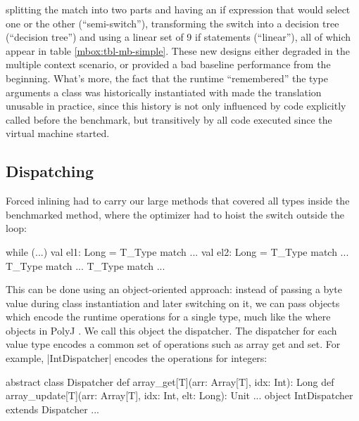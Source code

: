  splitting the match into two parts and having an if expression that would select one or the other (``semi-switch''), transforming the switch into a decision tree (``decision tree'') and using a linear set of 9 if statements (``linear''), all of which appear in table \ref{mbox:tbl-mb-simple}. These new designs either degraded in the multiple context scenario, or provided a bad baseline performance from the beginning. What's more, the fact that the runtime ``remembered'' the type arguments a class was historically instantiated with made the translation unusable in practice, since this history is not only influenced by code explicitly called before the benchmark, but transitively by all code executed since the virtual machine started. %

\subsection{Dispatching}
\label{mbox:subsec-mb-dispatching}

 Forced inlining had to carry our large methods that covered all types inside the benchmarked method, where the optimizer had to hoist the switch outside the loop:

\begin{lstlisting-nobreak}
 while (...) {
   val el1: Long = T_Type match { ... }
   val el2: Long = T_Type match { ... }
   T_Type match { ... }
   T_Type match { ... }
 }
\end{lstlisting-nobreak}

 This can be done using an object-oriented approach: instead of passing a byte value during class instantiation and later switching on it, we can pass objects which encode the runtime operations for a single type, much like the where objects in PolyJ \cite{myers-polyj}. We call this object the dispatcher. The dispatcher for each value type encodes a common set of operations such as array get and set. For example, |IntDispatcher| encodes the operations for integers:

\begin{lstlisting-nobreak}
 abstract class Dispatcher {
   def array_get[T](arr: Array[T], idx: Int): Long
   def array_update[T](arr: Array[T], idx: Int, elt: Long): Unit
   ...
 }
 object IntDispatcher extends Dispatcher { ... }
\end{lstlisting-nobreak}

